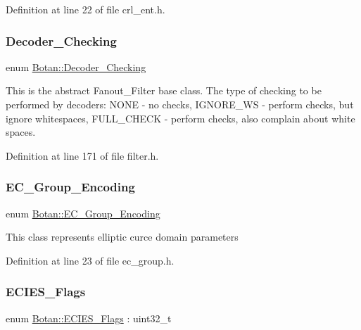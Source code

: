 Definition at line 22 of file crl\+\_\+ent.\+h.

\mbox{\label{namespace_botan_acd5baf937a9984c39f8b44104dde76ae}} 
\subsubsection{\texorpdfstring{Decoder\+\_\+\+Checking}{Decoder\_Checking}}
{\footnotesize\ttfamily enum \mbox{\hyperlink{namespace_botan_acd5baf937a9984c39f8b44104dde76ae}{Botan\+::\+Decoder\+\_\+\+Checking}}}

This is the abstract Fanout\+\_\+\+Filter base class. The type of checking to be performed by decoders\+: N\+O\+NE -\/ no checks, I\+G\+N\+O\+R\+E\+\_\+\+WS -\/ perform checks, but ignore whitespaces, F\+U\+L\+L\+\_\+\+C\+H\+E\+CK -\/ perform checks, also complain about white spaces. 

Definition at line 171 of file filter.\+h.

\mbox{\label{namespace_botan_ad0ee6307c8f311388a2bc00426a7f858}} 
\subsubsection{\texorpdfstring{E\+C\+\_\+\+Group\+\_\+\+Encoding}{EC\_Group\_Encoding}}
{\footnotesize\ttfamily enum \mbox{\hyperlink{namespace_botan_ad0ee6307c8f311388a2bc00426a7f858}{Botan\+::\+E\+C\+\_\+\+Group\+\_\+\+Encoding}}}

This class represents elliptic curce domain parameters 

Definition at line 23 of file ec\+\_\+group.\+h.

\mbox{\label{namespace_botan_a9633493dccb5f879eeafafe99c71f6e8}} 
\subsubsection{\texorpdfstring{E\+C\+I\+E\+S\+\_\+\+Flags}{ECIES\_Flags}}
{\footnotesize\ttfamily enum \mbox{\hyperlink{namespace_botan_a9633493dccb5f879eeafafe99c71f6e8}{Botan\+::\+E\+C\+I\+E\+S\+\_\+\+Flags}} \+: uint32\+\_\+t\hspace{0.3cm}{\ttfamily [strong]}}

